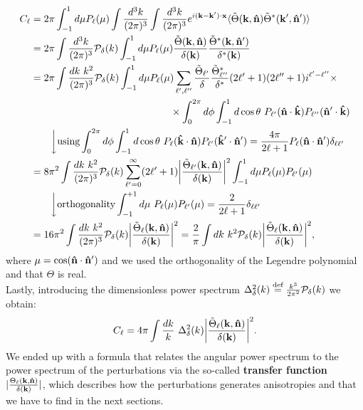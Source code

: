 \begin{align}
    C_{\ell}&=2\pi\int_{-1}^{1}d\mu P_{\ell}(\mu)\int\frac{d^3k}{(2\pi)^3}\int\frac{d^3k}{(2\pi)^3}e^{i(\mathbf k-\mathbf k')\cdot \mathbf x}\langle\tilde\Theta(\mathbf k,\versor n)\tilde\Theta^*(\mathbf k',\versor n')\rangle\nonumber\\
    &=2\pi\int\frac{d^3k}{(2\pi)^3}\mathcal P_{\delta}(k)\int_{-1}^{1}d\mu P_{\ell}(\mu)\frac{\tilde\Theta(\mathbf{k},\versor n)}{\delta(\mathbf{k})}\frac{\tilde\Theta^*(\mathbf{k},\versor n')}{\delta^*(\mathbf{k})}\nonumber\\
    &=2\pi\int\frac{dk\ k^2}{(2\pi)^3}\mathcal P_{\delta}(k)\int_{-1}^{1}d\mu P_{\ell}(\mu)\sum_{\ell',\ell''}\frac{\tilde\Theta_{\ell'}}{\delta}\frac{\tilde\Theta_{\ell''}^*}{\delta^*}(2\ell'+1)(2\ell''+1)i^{\ell'-\ell''}\times\nonumber\\
    &\qquad\qquad\qquad\qquad\qquad\qquad\qquad\times\int_0^{2\pi} d\phi \int_{-1}^{1} d\cos\theta\ P_{\ell'}(\versor n\cdot\versor k)P_{\ell''}(\versor n'\cdot\versor k)\nonumber\\
    &\qquad\bigg\downarrow\text{using}\int_0^{2\pi} d\phi \int_{-1}^{1} d\cos\theta\  P_\ell(\versor{k}\cdot\versor n)P_{\ell'}(\versor{k}'\cdot\versor n')=\frac{4\pi}{2\ell+1}P_\ell(\versor n\cdot\versor n')\delta_{\ell\ell'}\nonumber\\
    &=8\pi^2\int \frac{dk\ k^2}{(2\pi)^3}\mathcal{P}_{\delta}(k)\sum_{\ell'=0}^{\infty}(2\ell'+1)\bigg|\frac{\tilde\Theta_{\ell'}(\mathbf k,\versor n)}{\delta(\mathbf{k})}\bigg|^2\int_{-1}^{1}d\mu P_{\ell}(\mu)P_{\ell'}(\mu)\nonumber\\&\qquad\bigg\downarrow\text{orthogonality}\int_{-1}^{+1}d\mu\ P_\ell(\mu)P_{\ell'}(\mu)=\frac{2}{2\ell+1}\delta_{\ell\ell'}\nonumber\\
    &=16\pi^2\int \frac{dk\ k^2}{(2\pi)^3}\mathcal{P}_{\delta}(k)\bigg|\frac{\tilde\Theta_\ell(\mathbf k,\versor n)}{\delta(\mathbf{k})}\bigg|^2=\frac{2}{\pi}\int dk\ k^2\mathcal{P}_{\delta}(k)\bigg|\frac{\tilde\Theta_\ell(\mathbf k,\versor n)}{\delta(\mathbf{k})}\bigg|^2
    ,\label{eq:cl_pert}
\end{align}
where $\mu=\cos(\mathbf{\hat{n}}\cdot\mathbf{\hat{n}}')$ and we used the orthogonality of the Legendre polynomial and that $\Theta$ is real.\\
Lastly, introducing the dimensionless power spectrum $\Delta^2_{\delta}(k)\stackrel{\text{def}}{=}\frac{k^3}{2\pi^2}\mathcal P_{\delta}(k)$ we obtain:
\begin{equation}
    C_{\ell}=4\pi\int \frac{dk}{k}\ \Delta^2_{\delta}(k)\bigg|\frac{\tilde\Theta_\ell(\mathbf k,\versor n)}{\delta(\mathbf{k})}\bigg|^2.
\end{equation}
We ended up with a formula that relates the angular power spectrum to the power spectrum of the perturbations via the so-called \textbf{transfer function} $|\frac{\Theta_\ell(\mathbf k,\mathbf{\hat{n}})}{\delta(\mathbf{k})}|$, which describes how the perturbations generates anisotropies and that we have to find in the next sections.\\
